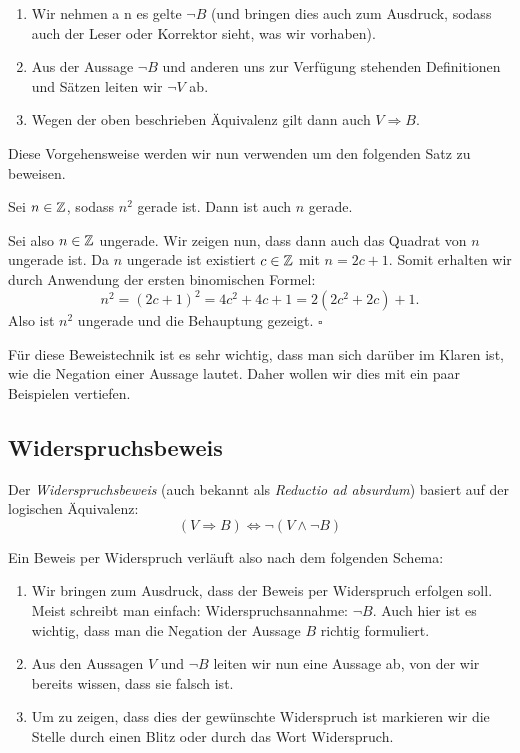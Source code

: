 \begin{enumerate}
\item Wir nehmen a n es gelte $\neg B$ (und bringen dies auch zum Ausdruck,
sodass auch der Leser oder Korrektor sieht, was wir vorhaben).

\item Aus der Aussage $\neg B$ und anderen uns zur Verfügung stehenden
Definitionen und Sätzen leiten wir $\neg V$ ab.

\item Wegen der oben beschrieben Äquivalenz gilt dann auch $V \Rightarrow B$.
\end{enumerate}


Diese Vorgehensweise werden wir nun verwenden um den folgenden Satz zu beweisen.


\begin{theorem}
Sei $n \in \mathbb{Z}$, sodass $n^2$ gerade ist.
Dann ist auch $n$ gerade.
\end{theorem}

\begin{proof*}
Sei also $n \in \mathbb{Z}$ ungerade.
Wir zeigen nun, dass dann auch das Quadrat
von $n$ ungerade ist.
Da $n$ ungerade ist existiert $c \in \mathbb{Z}$ mit $n = 2c + 1$.
Somit erhalten wir durch Anwendung der ersten binomischen Formel:
\[
    n^2 = (2c +1)^2 = 4c^2 + 4c + 1 = 2(2c^2 + 2c) + 1 .
\]
Also ist $n^2$ ungerade und die Behauptung gezeigt.
\hfill $\square$
\end{proof*}


Für diese Beweistechnik ist es sehr wichtig, dass man sich darüber im Klaren
ist, wie die Negation einer Aussage lautet.
Daher wollen wir dies mit ein paar Beispielen vertiefen.


\subsection{Widerspruchsbeweis} %

Der \textit{Widerspruchsbeweis} (auch bekannt als \textit{Reductio ad absurdum})
basiert auf der logischen Äquivalenz:
\[
(V \Rightarrow B) \iff \neg (V \wedge \neg B)
\]

Ein Beweis per Widerspruch verläuft also nach dem folgenden Schema:

\begin{enumerate}
\item Wir bringen zum Ausdruck, dass der Beweis per Widerspruch erfolgen soll.
Meist schreibt man einfach: \glqq Widerspruchsannahme: $\neg B$\grqq.
Auch hier ist es wichtig, dass man die Negation der Aussage $B$ richtig
formuliert.

\item Aus den Aussagen $V$ und $\neg B$ leiten wir nun eine Aussage ab, von der
wir bereits wissen, dass sie falsch ist.

\item Um zu zeigen, dass dies der gewünschte Widerspruch ist markieren wir die
Stelle durch einen Blitz oder durch das Wort \glqq Widerspruch\grqq.
\end{enumerate}

